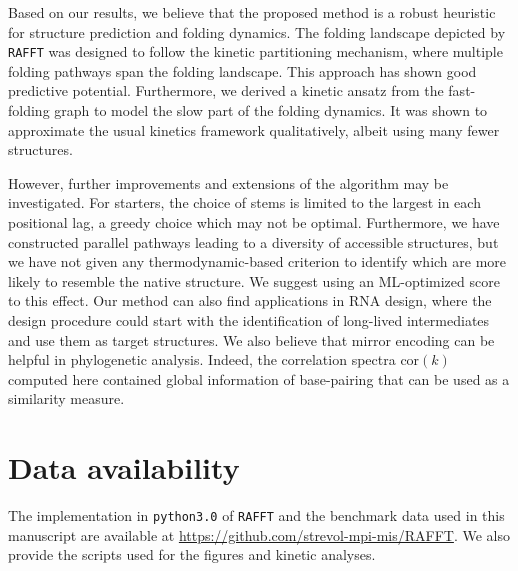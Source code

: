 Based on our results, we believe that the proposed method is a robust heuristic for structure prediction and folding dynamics. The folding landscape depicted by \texttt{RAFFT} was designed to follow the kinetic partitioning mechanism, where multiple folding pathways span the folding landscape. This approach has shown good predictive potential. Furthermore, we derived a kinetic ansatz from the fast-folding graph to model the slow part of the folding dynamics. It was shown to approximate the usual kinetics framework qualitatively, albeit using many fewer structures. 

However, further improvements and extensions of the algorithm may be investigated. For starters, the choice of stems is limited to the largest in each positional lag, a greedy choice which may not be optimal. Furthermore, we have constructed parallel pathways leading to a diversity of accessible structures, but we have not given any thermodynamic-based criterion to identify which are more likely to resemble the native structure. We suggest using an ML-optimized score to this effect. Our method can also find applications in RNA design, where the design procedure could start with the identification of long-lived intermediates and use them as target structures. We also believe that mirror encoding can be helpful in phylogenetic analysis. Indeed, the correlation spectra \(\text{cor}(k)\) computed here contained global information of base-pairing that can be used as a similarity measure.




\section*{Data availability}
The implementation in \texttt{python3.0} of \texttt{RAFFT} and the benchmark data used in this manuscript are available at \url{https://github.com/strevol-mpi-mis/RAFFT}. We also provide the scripts used for the figures and kinetic analyses.